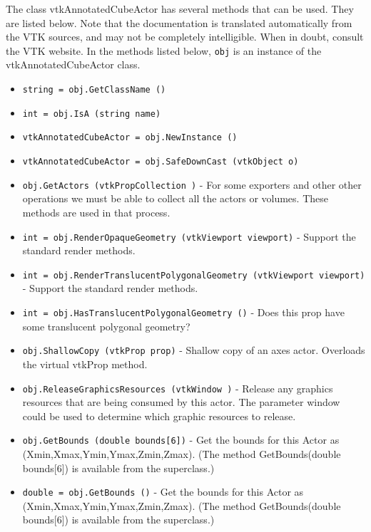 The class vtkAnnotatedCubeActor has several methods that can be used.
  They are listed below.
Note that the documentation is translated automatically from the VTK sources,
and may not be completely intelligible.  When in doubt, consult the VTK website.
In the methods listed below, \verb|obj| is an instance of the vtkAnnotatedCubeActor class.
\begin{itemize}
\item  \verb|string = obj.GetClassName ()|

\item  \verb|int = obj.IsA (string name)|

\item  \verb|vtkAnnotatedCubeActor = obj.NewInstance ()|

\item  \verb|vtkAnnotatedCubeActor = obj.SafeDownCast (vtkObject o)|

\item  \verb|obj.GetActors (vtkPropCollection )| -  For some exporters and other other operations we must be
 able to collect all the actors or volumes. These methods
 are used in that process.

\item  \verb|int = obj.RenderOpaqueGeometry (vtkViewport viewport)| -  Support the standard render methods.

\item  \verb|int = obj.RenderTranslucentPolygonalGeometry (vtkViewport viewport)| -  Support the standard render methods.

\item  \verb|int = obj.HasTranslucentPolygonalGeometry ()| -  Does this prop have some translucent polygonal geometry?

\item  \verb|obj.ShallowCopy (vtkProp prop)| -  Shallow copy of an axes actor. Overloads the virtual vtkProp method.

\item  \verb|obj.ReleaseGraphicsResources (vtkWindow )| -  Release any graphics resources that are being consumed by this actor.
 The parameter window could be used to determine which graphic
 resources to release.

\item  \verb|obj.GetBounds (double bounds[6])| -  Get the bounds for this Actor as (Xmin,Xmax,Ymin,Ymax,Zmin,Zmax). (The
 method GetBounds(double bounds[6]) is available from the superclass.)

\item  \verb|double = obj.GetBounds ()| -  Get the bounds for this Actor as (Xmin,Xmax,Ymin,Ymax,Zmin,Zmax). (The
 method GetBounds(double bounds[6]) is available from the superclass.)


\end{itemize}
